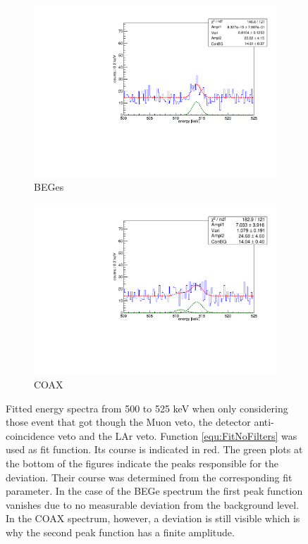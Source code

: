 \documentclass[encoding=utf8,british]{tumphthesis}
\begin{document}
\begin{figure}[t!]
	\centering
	\begin{subfigure}{.5\textwidth}
		\centering
		\includegraphics[width=\textwidth]{./Bilder/500525FitLArVetoBEGes.pdf}
		\caption{BEGes}
		\label{fig:FitLArVetoBEGes}
	\end{subfigure}\hfill%
	\begin{subfigure}{.5\textwidth}
		\centering
		\includegraphics[width=\textwidth]{./Bilder/500525FitLArVetoCOAX.pdf}
		\caption{COAX}
		\label{fig:FitLArVetoCOAX}
	\end{subfigure}
	\caption{
	Fitted energy spectra from 500 to 525 keV when only considering those event that got though the Muon veto, the detector anti-coincidence veto and the LAr veto. 
	Function \ref{equ:FitNoFilters} was used as fit function. 
	Its course is indicated in red. 
	The green plots at the bottom of the figures indicate the peaks responsible for the deviation. 
	Their course was determined from the corresponding fit parameter.
    In the case of the BEGe spectrum the first peak function vanishes due to no measurable deviation from the background level.
    In the COAX spectrum, however, a deviation is still visible which is why the second peak function has a finite amplitude.
	}
\end{figure}
\end{document}
